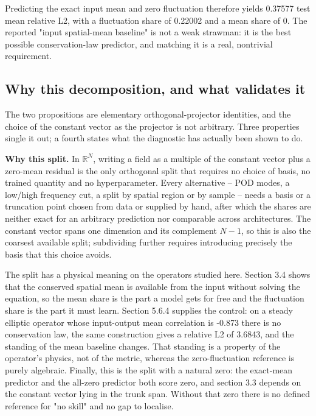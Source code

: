 \documentclass[preprint,12pt]{elsarticle}
\begin{document}
Predicting the exact input mean and zero fluctuation therefore yields 0.37577 test mean relative L2, with a fluctuation share of 0.22002 and a mean share of 0. The reported "input spatial-mean baseline" is not a weak strawman: it is the best possible conservation-law predictor, and matching it is a real, nontrivial requirement.

\subsection{Why this decomposition, and what validates it}

The two propositions are elementary orthogonal-projector identities, and the choice of the constant vector as the projector is not arbitrary. Three properties single it out; a fourth states what the diagnostic has actually been shown to do.

\textbf{Why this split.} In $\mathbb{R}^N$, writing a field as a multiple of the constant vector plus a zero-mean residual is the only orthogonal split that requires no choice of basis, no trained quantity and no hyperparameter. Every alternative -- POD modes, a low/high frequency cut, a split by spatial region or by sample -- needs a basis or a truncation point chosen from data or supplied by hand, after which the shares are neither exact for an arbitrary prediction nor comparable across architectures. The constant vector spans one dimension and its complement $N-1$, so this is also the coarsest available split; subdividing further requires introducing precisely the basis that this choice avoids.

The split has a physical meaning on the operators studied here. Section 3.4 shows that the conserved spatial mean is available from the input without solving the equation, so the mean share is the part a model gets for free and the fluctuation share is the part it must learn. Section 5.6.4 supplies the control: on a steady elliptic operator whose input-output mean correlation is -0.873 there is no conservation law, the same construction gives a relative L2 of 3.6843, and the standing of the mean baseline changes. That standing is a property of the operator's physics, not of the metric, whereas the zero-fluctuation reference is purely algebraic. Finally, this is the split with a natural zero: the exact-mean predictor and the all-zero predictor both score zero, and section 3.3 depends on the constant vector lying in the trunk span. Without that zero there is no defined reference for "no skill" and no gap to localise.
\end{document}
